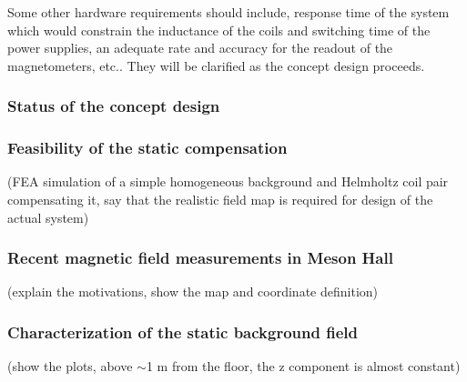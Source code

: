 Some other hardware requirements should include, response time of the system which would constrain the inductance of the coils and switching time of the power supplies, an adequate rate and accuracy for the readout of the magnetometers, etc.. They will be clarified as the concept design proceeds. 





\subsubsection{Status of the concept design}
\subsubsection*{Feasibility of the static compensation}
(FEA simulation of a simple homogeneous background and Helmholtz coil pair compensating it, say that the realistic field map is required for design of the actual system)

\subsubsection*{Recent magnetic field measurements in Meson Hall}
(explain the motivations, show the map and coordinate definition)
\subsubsection*{Characterization of the static background field}
(show the plots, above $\sim$1 m from the floor, the z component is almost constant)
